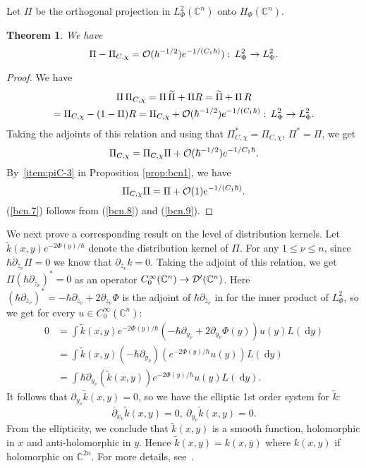\documentclass{article}
\newtheorem{theo}{Theorem}[section]
\newcommand{\DD}{\:\!\mathrm{d}}
\newcommand{\CM}{\mathbb{C}}
\newcommand{\h}{\hbar}
\begin{document}
\par Let $\Pi $ be the orthogonal projection in $L^2_\Phi (\CM^n) $
onto $H_\Phi (\CM^n)$.
\begin{theo}
  \label{theo:bcn2}
  We have
  \begin{equation}\label{bcn.7}
    \Pi -\Pi _{C,\chi }={\cal O}(\h^{-1/2})e^{-1/(C_1\h)}):\, L^2_\Phi \to
    L^2_\Phi .
  \end{equation}
\end{theo}
\begin{proof}
  We have
  \begin{multline}
    \Pi \, \Pi _{C,\chi }=\Pi\, \widetilde{\Pi }+\Pi R =
    \widetilde{\Pi }+\Pi\, R\\
    =\Pi _{C,\chi }-(1-\Pi )R=\Pi _{C,\chi }+{\cal
      O}(\h^{-1/2})e^{-1/(C_1\h)}:\, L^2_\Phi \to L^2_\Phi .
  \end{multline}
  Taking the adjoints of this relation and using that
  $\Pi ^*_{C,\chi }=\Pi _{C,\chi }$, $\Pi ^*=\Pi $, we get
  \begin{equation}\label{bcn.8}
    \Pi _{C,\chi} =\Pi _{C,\chi }\Pi +{\cal O}(\h^{-1/2})e^{-1/C_1\h}.
  \end{equation}
  By~\ref{item:piC-3} in Proposition \ref{prop:bcn1}, we have
  \begin{equation}\label{bcn.9}
    \Pi _{C,\chi }\Pi =\Pi +{\cal O}(1)e^{-1/(C_1\h)}.
  \end{equation}
  (\ref{bcn.7}) follows from (\ref{bcn.8}) and (\ref{bcn.9}).
\end{proof}
\par We next prove a corresponding result on the level of distribution
kernels. Let $\widetilde{k}(x,y)e^{-2\Phi (y)/\h}$ denote the
distribution kernel of $\Pi $. For any $1\leq \nu \leq n$, since
$\h\partial_{\bar z_\nu} \Pi =0$ we know that
$\partial_{\bar z_\nu} k=0$. Taking the adjoint of this relation, we
get $\Pi (\h\partial_{\bar z_\nu})^*=0 $ as an operator
$C_0^\infty (\CM^n)\to {\cal D}'(\CM^n)$. Here
$(\h\partial_{\bar z_\nu})^*=-\h\partial_{z_\nu} +
2\partial_{z_\nu}\Phi $
is the adjoint of $\h\partial_{\bar z_\nu} $ in for the inner product
of $L^2_\Phi $, so we get for every $u\in C_0^\infty (\CM^n)$:
\[
\begin{split}
  0&=\int \widetilde{k}(x,y)e^{-2\Phi (y)/\h}(-\h\partial
  _{y_\nu}+2\partial
  _{y_\nu}\Phi (y))u(y)L(\DD y)\\
  &= \int \widetilde{k}(x,y)(-\h\partial _{y_\nu})(e^{-2\Phi (y)/\h}u(y))L(\DD y)\\
  &=\int \h\partial _{y_\nu}(\widetilde{k}(x,y)) e^{-2\Phi
    (y)/\h}u(y)L(\DD y).
\end{split}
\]
It follows that $\partial _{y_\nu}\widetilde{k}(x,y)=0$, so we have
the elliptic 1st order system for $\widetilde{k}$:
\[
\overline{\partial }_{x_\nu} \widetilde{k}(x,y)=0,\ \partial
_{y_\nu}\widetilde{k}(x,y)=0.
\]
From the ellipticity, we conclude that $\widetilde{k}(x,y)$ is a
smooth function, holomorphic in $x$ and anti-holomorphic in $y$. Hence
$\widetilde{k}(x,y)=k(x,\bar{y})$ where $k(x,y)$ if holomorphic on
$\CM^{2n}$. For more details, see~\cite{co-hi-sjo-18}.
\end{document}
